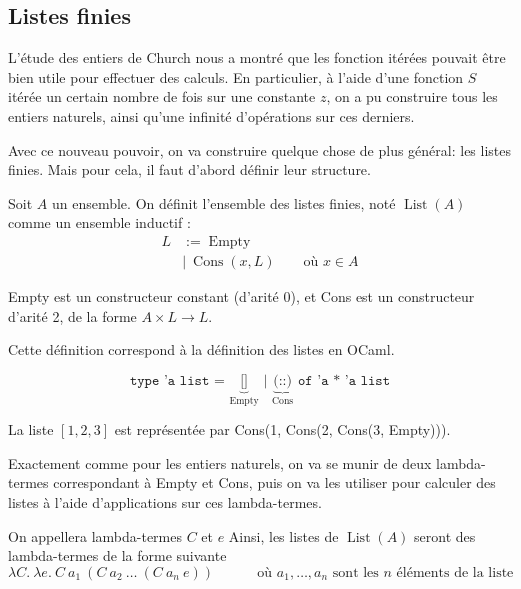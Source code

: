 \documentclass[11pt]{article}
\begin{document}
\subsection{Listes finies}
L'étude des entiers de Church nous a montré que les fonction itérées pouvait être bien utile pour effectuer des calculs. En particulier, à l'aide d'une fonction $S$ itérée un certain nombre de fois sur une constante $z$, on a pu construire tous les entiers naturels, ainsi qu'une infinité d'opérations sur ces derniers.

Avec ce nouveau pouvoir, on va construire quelque chose de plus général: les listes finies. Mais pour cela, il faut d'abord définir leur structure.

\begin{definition}
    Soit $A$ un ensemble. On définit l'ensemble des listes finies, noté $\operatorname{List}(A)$ comme un ensemble inductif :
    \begin{equation*}
    \begin{aligned}
        L &:= \operatorname{Empty}\\
        &\mid~\operatorname{Cons}(x, L)~~~~~~~~~\text{où $x\in A$}
    \end{aligned}
    \end{equation*}

    Empty est un constructeur constant (d'arité 0), et Cons est un constructeur d'arité 2, de la forme $A\times L \to L$.
\end{definition}

\begin{remark}
    Cette définition correspond à la définition des listes en OCaml.

    $$\texttt{type 'a list = }\underbrace{\texttt{[]}}_\text{Empty}\texttt{ | }\underbrace{\texttt{(::)}}_\text{Cons}\texttt{ of 'a * 'a list}$$
\end{remark}

\begin{example}
    La liste $\left[1, 2, 3\right]$ est représentée par Cons(1, Cons(2, Cons(3, Empty))).
\end{example}

Exactement comme pour les entiers naturels, on va se munir de deux lambda-termes correspondant à Empty et Cons, puis on va les utiliser pour calculer des listes à l'aide d'applications sur ces lambda-termes.

On appellera lambda-termes $C$ et $e$ Ainsi, les listes de $\operatorname{List}(A)$ seront des lambda-termes de la forme suivante $$\lambda C.~ \lambda e.~ C~a_1~(C~a_2~\dots~(C~a_n~e))~~~~~~~~~~~~~~\text{où $a_1, \dots, a_n$ sont les $n$ éléments de la liste}$$
\end{document}
